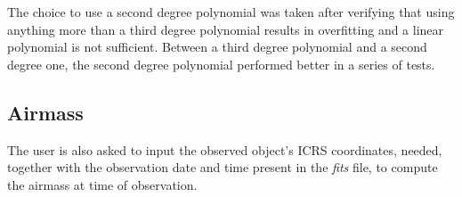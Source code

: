 \documentclass[a4paper]{article}
\begin{document}
\begin{multicols}{2}
			The choice to use a second degree polynomial was taken after verifying that using anything more than a third degree polynomial results in overfitting and a linear polynomial is not sufficient. Between a third degree polynomial and a second degree one, the second degree polynomial performed better in a series of tests.\\
		
		\subsection{Airmass}
			The user is also asked to input the observed object's ICRS coordinates, needed, together with the observation date and time present in the \textit{fits} file, to compute the airmass at time of observation.\\
		
	\end{multicols}

	\vspace{0.035\textheight}
\end{document}
